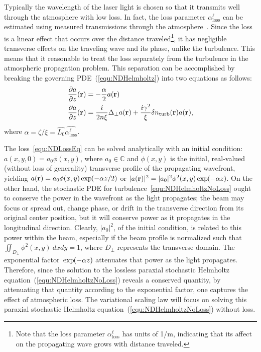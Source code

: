 \documentclass[9pt,twocolumn,twoside]{osajnl}
\def\exp#1{\,\mathrm{exp}\hspace{-0.03in}\left(#1 \right)}
\newcommand{\la}[1]{\label{#1}}
\newcommand{\CP}{\mathbb{C}}
\newcommand{\pp}[2]{\frac{\partial #1}{\partial #2}}
\begin{document}
Typically the wavelength of the laser light is chosen so that it transmits 
well through the atmosphere with low loss.  In fact, the loss parameter 
$\alpha_{\text{loss}}^{\ell}$ can be estimated using measured transmissions 
through the atmosphere~\cite{hemming2014review}.  Since the loss is a linear 
effect that occurs over the distance traveled\footnote{Note that the loss 
parameter $\alpha_{\text{loss}}^{\ell}$ has units of 1/m, indicating that its 
affect on the propagating wave grows with distance traveled.}, it has negligible 
transverse effects on the traveling wave and its phase, unlike the turbulence.  
This means that it reasonable to treat the loss separately from the turbulence in 
the atmospheric propagation problem.  This separation can be accomplished by breaking 
the governing PDE~(\ref{equ:NDHelmholtz}) into two equations as follows:
\begin{align}
	\pp{a}{z}({\bf r}) & = -\frac{\alpha}{2} a({\bf r}) \la{equ:NDLossEq} \\
	\pp{a}{z}({\bf r}) & = \frac{i}{2 n \xi}\Delta_{\perp} a({\bf r}) + 
\frac{i \gamma^{2}}{\xi} \delta n_{\text{turb}}({\bf r}) a({\bf r}) \la{equ:NDHelmholtzNoLoss},
\end{align}
where $\alpha = \zeta / \xi = \widehat{L_{0}} \widehat{\alpha_{\text{loss}}^{\ell}}$.  

The loss~\eqref{equ:NDLossEq} can be solved analytically with an initial 
condition: $a(x,y,0) = a_{0} \phi(x,y)$, where $a_{0} \in \CP$ and $\phi(x,y)$ is the 
initial, real-valued (without loss of generality) transverse profile of the propagating 
wavefront, yielding $a({\bf r}) = a_{0} \phi(x,y) \exp{-\alpha z / 2}$ or 
$|a({\bf r})|^{2} = |a_{0}|^{2} \phi^{2}(x,y) \exp{-\alpha z}$.  
On the other hand, the stochastic PDE for turbulence~\eqref{equ:NDHelmholtzNoLoss} ought 
to conserve the power in the wavefront as the light propagates; the beam 
may focus or spread out, change phase, or drift in the transverse direction from its 
original center position, but it will conserve power as it propagates in the 
longitudinal direction.  Clearly, $|a_{0}|^{2}$, of the initial condition, is related to 
this power within the beam, especially if the beam profile is normalized such 
that $\iint_{D_{\perp}} \phi^{2}(x,y) \ dxdy = 1$, where $D_{\perp}$ represents the 
transverse domain. The exponential factor $\exp{-\alpha z}$ attenuates that power 
as the light propagates.  Therefore, since the solution to the lossless paraxial 
stochastic Helmholtz equation~(\ref{equ:NDHelmholtzNoLoss}) reveals a conserved quantity, 
by attenuating that quantity according to the exponential factor, one captures the effect of atmospheric loss.  
The variational scaling law will focus on solving this paraxial stochastic Helmholtz equation~(\ref{equ:NDHelmholtzNoLoss}) without loss. 
\end{document}
